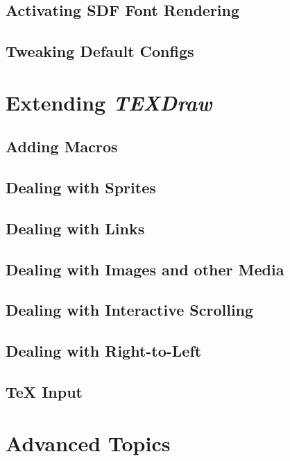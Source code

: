 \documentclass[12pt]{article}
\def\TEXDraw{\textit{TEXDraw}}
\begin{document}
	\subsection{Activating SDF Font Rendering}
 	
 	\subsection{Tweaking Default Configs}
 	
 	\section{Extending \TEXDraw}
 	
 	\subsection{Adding Macros}
 	
 	\subsection{Dealing with Sprites}
 	
 	\subsection{Dealing with Links}
 	 	
 	\subsection{Dealing with Images and other Media}
	 	
    \subsection{Dealing with Interactive Scrolling}

  	\subsection{Dealing with Right-to-Left}
 	
 	\subsection{TeX Input}
 	
 	\section{Advanced Topics}
 	
\end{document}
